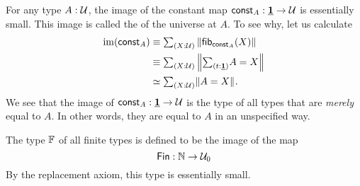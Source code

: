 \begin{eg}
  For any type $A:\mathcal{U}$, the image of the constant map $\mathsf{const}_A:\underline{\mathbf{1}}\to \mathcal{U}$ is essentially small. This image is called the  of the universe at $A$. To see why, let us calculate
  \begin{align*} 
    \im(\const_A) & \jdeq \sm{X:\UU}\Brck{\fib{\const_A}{X}} \\
                  & \jdeq \sm{X:\UU}\Brck{\sm{t:\unit}A=X} \\
                  & \simeq \sm{X:\UU}\brck{A=X}.
  \end{align*}
  We see that the image of $\mathsf{const}_A:\underline{\mathbf{1}}\to\mathcal{U}$ is the type of all types that are \emph{merely} equal to $A$. In other words, they are equal to $A$ in an unspecified way.
\end{eg}

\begin{eg}
  The type $\mathbb{F}$ of all finite types is defined to be the image of the map
  \begin{equation*}
    \mathsf{Fin} : {\mathbb{N}}\to\mathcal{U}_0
  \end{equation*}
  By the replacement axiom, this type is essentially small. 
\end{eg}

